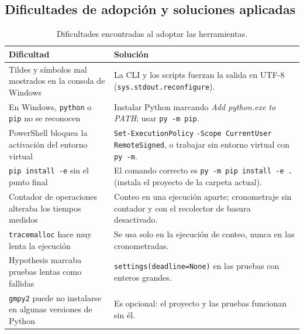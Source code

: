 \subsection{Dificultades de adopción y soluciones aplicadas}

\begin{table}[H]
\centering\small
\caption{Dificultades encontradas al adoptar las herramientas.}
\label{tab:dificultades-stack}
\begin{tabularx}{\textwidth}{@{}R{4.6cm} Y@{}}
\toprule
\textbf{Dificultad} & \textbf{Solución}\\
\midrule
Tildes y símbolos mal mostrados en la consola de Windows & La CLI y los scripts fuerzan la salida en UTF-8 (\texttt{sys.stdout.reconfigure}).\\
En Windows, \texttt{python} o \texttt{pip} no se reconocen & Instalar Python marcando \emph{Add python.exe to PATH}; usar \texttt{py -m pip}.\\
PowerShell bloquea la activación del entorno virtual & \texttt{Set-ExecutionPolicy} \texttt{-Scope CurrentUser} \texttt{RemoteSigned}, o trabajar sin entorno virtual con \texttt{py -m}.\\
\texttt{pip install -e} sin el punto final & El comando correcto es \texttt{py -m pip install -e .} (instala el proyecto de la carpeta actual).\\
Contador de operaciones alteraba los tiempos medidos & Conteo en una ejecución aparte; cronometraje sin contador y con el recolector de basura desactivado.\\
\texttt{tracemalloc} hace muy lenta la ejecución & Se usa solo en la ejecución de conteo, nunca en las cronometradas.\\
Hypothesis marcaba pruebas lentas como fallidas & \texttt{settings(deadline=None)} en las pruebas con enteros grandes.\\
\texttt{gmpy2} puede no instalarse en algunas versiones de Python & Es opcional: el proyecto y las pruebas funcionan sin él.\\
\bottomrule
\end{tabularx}
\end{table}
